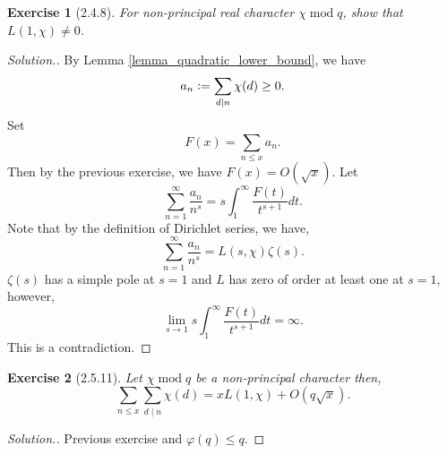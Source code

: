 \documentclass{article}
\newtheorem{exercise}{Exercise}[section]
\DeclareMathOperator{\tmod}{mod}
\newcommand{\defeq}{\vcentcolon=}
\begin{document}
\begin{exercise}[2.4.8]
  For non-principal real character $\chi\tmod q$, show that $L(1,\chi)\not=0$.
\end{exercise}
\begin{proof}[Solution.]
  By Lemma \ref{lemma_quadratic_lower_bound}, we have 
  \begin{equation*}
    a_n \defeq \sum_{d|n}\chi(d)\geq0.
  \end{equation*}
  Set 
  \begin{equation*}
    F(x) = \sum_{n\leq x}a_n .
  \end{equation*}
  Then by the previous exercise, we have $F(x) = O(\sqrt{x})$. Let 
  \begin{equation*}
    \sum_{n=1}^\infty{\frac {a_n} {n^s}} = s\int_1^\infty {\frac {F(t)} {t^{s+1}}}dt.
  \end{equation*}
  Note that by the definition of Dirichlet series, we have,
  \begin{equation*}
    \sum_{n=1}^\infty{\frac {a_n} {n^s}} = L(s,\chi)\zeta(s).
  \end{equation*}
  $\zeta(s)$ has a simple pole at $s=1$ and $L$ has zero of order at least one at $s=1$, however, 
  \begin{equation*}
    \lim_{s\to 1}s\int_1^\infty {\frac {F(t)} {t^{s+1}}}dt = \infty.
  \end{equation*}
  This is a contradiction.
\end{proof}

\begin{exercise}[2.5.11]
  Let $\chi\tmod q$ be a non-principal character then,
  \begin{equation*}
    \sum_{n\leq x}\sum_{d\mid n}\chi(d) = xL(1,\chi)+O(q\sqrt{x}).
  \end{equation*}
\end{exercise}

\begin{proof}[Solution.]
  Previous exercise and $\varphi(q)\leq q$.
\end{proof}
\end{document}
